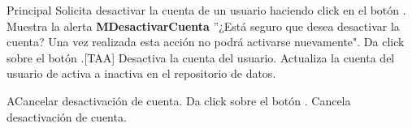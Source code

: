 \begin{UCtrayectoria}{Principal}
  \UCpaso[\UCactor] Solicita desactivar la cuenta de un usuario haciendo click en el botón .
  \UCpaso Muestra la alerta {\bf MDesactivarCuenta} ''¿Está seguro que desea desactivar la cuenta? Una vez realizada esta acción no podrá activarse nuevamente".
  \UCpaso[\UCactor] Da click sobre el botón .[TAA]
  \UCpaso Desactiva la cuenta del usuario.
  \UCpaso Actualiza la cuenta del usuario de activa a inactiva en el repositorio de datos.
\end{UCtrayectoria}

\begin{UCtrayectoriaA}{A}{Cancelar desactivación de cuenta.} 
  \UCpaso[\UCactor] Da click sobre el botón .
  \UCpaso Cancela desactivación de cuenta.
\end{UCtrayectoriaA}


